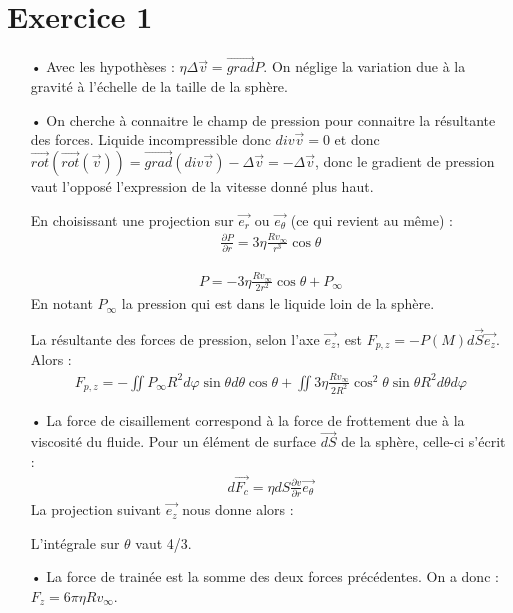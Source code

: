 \documentclass{report}
\begin{document}
\section*{Exercice 1}

\begin{itemize}
	\item[•] Avec les hypothèses : $\eta\Delta \vec{v} = \vec{grad}P$. On néglige la variation due à la gravité à l'échelle de la taille de la sphère.  
	\item[•] On cherche à connaitre le champ de pression pour connaitre la résultante des forces. 
	Liquide incompressible donc $div \vec{v}=0$ et donc $\vec{rot}(\vec{rot}(\vec{v}))=\vec{grad} (div \vec{v})-\Delta \vec{v}=-\Delta \vec{v}$, donc le gradient de pression vaut l'opposé l'expression de la vitesse donné plus haut.
	
	En choisissant une projection sur $\vec{e_r}$ ou $\vec{e_\theta}$ (ce qui revient au même) :
	\begin{align*}
		\frac{\partial P}{\partial r} = 3\eta\frac{Rv_\infty}{r^3}\cos\theta 
	\end{align*}
	
	\begin{align*}
		P = -3\eta\frac{Rv_\infty}{2r^2}\cos\theta + P_\infty
	\end{align*}
En notant $P_\infty$ la pression qui est dans le liquide loin de la sphère.

La résultante des forces de pression, selon l'axe $\vec{e_z}$, est $F_{p,z}=-P(M)d\vec{S}\vec{e_z}$. Alors :
\begin{align*}
	F_{p,z} = -\iint P_\infty R^2d\varphi \sin\theta d\theta \cos\theta + \iint 3\eta\frac{Rv_\infty}{2R^2}\cos^2\theta \sin\theta R^2d\theta d\varphi
\end{align*}
\noindent{}

\item[•] La force de cisaillement correspond à la force de frottement due à la viscosité du fluide. Pour un élément de surface $\vec{dS}$ de la sphère, celle-ci s'écrit :
\begin{align*}
	d\vec{F_c}=\eta dS \frac{\partial v}{\partial r}\vec{e_\theta}
\end{align*}
La projection suivant $\vec{e_z}$ nous donne alors :

\noindent{}
L'intégrale sur $\theta$ vaut 4/3.

\item[•] La force de trainée est la somme des deux forces précédentes. On a donc : $F_z = 6\pi\eta Rv_\infty$.
\end{itemize}
\end{document}
